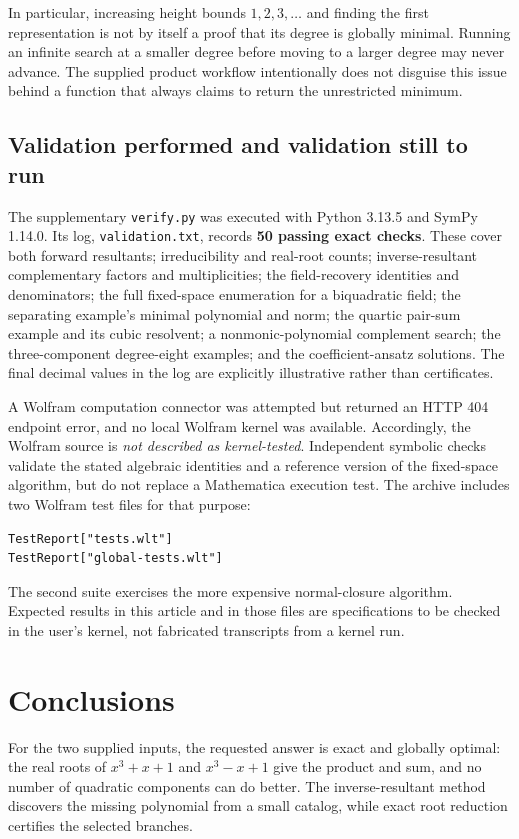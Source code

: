 \documentclass[11pt,letterpaper]{article}
\theoremstyle{definition}
\newcommand{\code}[1]{\texttt{#1}}
\begin{document}
In particular, increasing height bounds $1,2,3,\ldots$ and finding the first representation is not by itself a proof that its degree is globally minimal. Running an infinite search at a smaller degree before moving to a larger degree may never advance. The supplied product workflow intentionally does not disguise this issue behind a function that always claims to return the unrestricted minimum.

\subsection{Validation performed and validation still to run}
The supplementary \code{verify.py} was executed with Python 3.13.5 and SymPy 1.14.0. Its log, \code{validation.txt}, records \textbf{50 passing exact checks}. These cover both forward resultants; irreducibility and real-root counts; inverse-resultant complementary factors and multiplicities; the field-recovery identities and denominators; the full fixed-space enumeration for a biquadratic field; the separating example's minimal polynomial and norm; the quartic pair-sum example and its cubic resolvent; a nonmonic-polynomial complement search; the three-component degree-eight examples; and the coefficient-ansatz solutions. The final decimal values in the log are explicitly illustrative rather than certificates.

A Wolfram computation connector was attempted but returned an HTTP 404 endpoint error, and no local Wolfram kernel was available. Accordingly, the Wolfram source is \emph{not described as kernel-tested}. Independent symbolic checks validate the stated algebraic identities and a reference version of the fixed-space algorithm, but do not replace a Mathematica execution test. The archive includes two Wolfram test files for that purpose:
\begin{samepage}
\begin{lstlisting}
TestReport["tests.wlt"]
TestReport["global-tests.wlt"]
\end{lstlisting}
\end{samepage}
The second suite exercises the more expensive normal-closure algorithm. Expected results in this article and in those files are specifications to be checked in the user's kernel, not fabricated transcripts from a kernel run.

\section{Conclusions}
For the two supplied inputs, the requested answer is exact and globally optimal: the real roots of $x^3+x+1$ and $x^3-x+1$ give the product and sum, and no number of quadratic components can do better. The inverse-resultant method discovers the missing polynomial from a small catalog, while exact root reduction certifies the selected branches.
\end{document}
